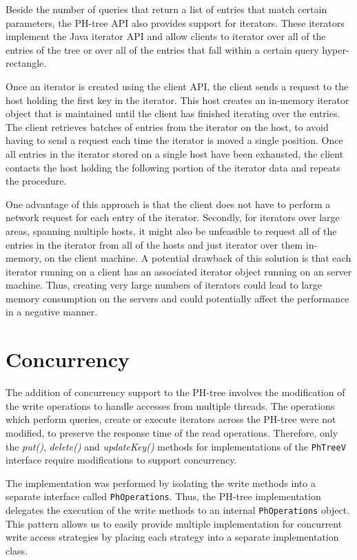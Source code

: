 \documentclass[11pt,a4paper]{globis-book}
\begin{document}
Beside the number of queries that return a list of entries that match certain parameters, the PH-tree API also provides support for iterators. These iterators implement the Java iterator API and allow clients to iterator over all of the entries of the tree or over all of the entries that fall within a certain query hyper-rectangle.

Once an iterator is created using the client API, the client sends a request to the host holding the first key in the iterator. This host creates an in-memory iterator object that is maintained until the client has finished iterating over the entries. The client retrieves batches of entries from the iterator on the host, to avoid having to send a request each time the iterator is moved a single position. Once all entries in the iterator stored on a single host have been exhausted, the client contacts the host holding the following portion of the iterator data and repeats the procedure. 

One advantage of this approach is that the client does not have to perform a network request for each entry of the iterator. Secondly, for iterators over large areas, spanning multiple hosts, it might also be unfeasible to request all of the entries in the iterator from all of the hosts and just iterator over them in-memory, on the client machine. A potential drawback of this solution is that each iterator running on a client has an associated iterator object running on an server machine. Thus, creating very large numbers of iterators could lead to large memory consumption on the servers and could potentially affect the performance in a negative manner.

\section{Concurrency}

The addition of concurrency support to the PH-tree involves the modification of the write operations to handle accesses from multiple threads. The operations which perform queries, create or execute iterators across the PH-tree were not modified, to preserve the response time of the read operations. Therefore, only the \textit{put()}, \textit{delete()} and \textit{updateKey()} methods for implementations of the \texttt{PhTreeV} interface require modifications to support concurrency. 

The implementation was performed by isolating the write methods into a separate interface called \texttt{PhOperations}. Thus, the PH-tree implementation delegates the execution of the write methods to an internal \texttt{PhOperations} object. This pattern allows us to easily provide multiple implementation for concurrent write access strategies by placing each strategy into a separate implementation class. 
\end{document}
